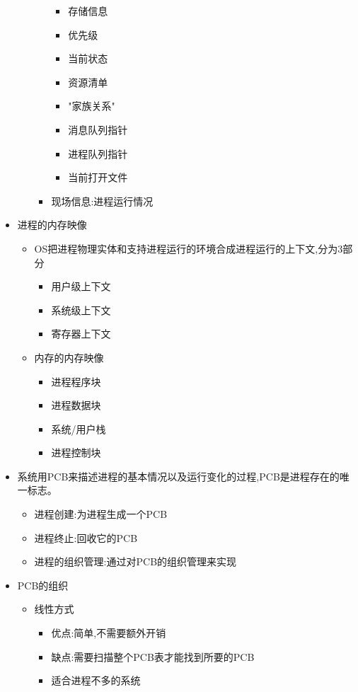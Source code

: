 \documentclass[a4paper,12pt,notitlepage]{article}
\begin{document}
\begin{itemize}
\begin{itemize}
\begin{itemize}
\begin{itemize}
				\item 存储信息
				\item 优先级
				\item 当前状态
				\item 资源清单
				\item "家族关系"
				\item 消息队列指针
				\item 进程队列指针
				\item 当前打开文件
			\end{itemize}
			\item 现场信息:进程运行情况
		\end{itemize}
	\end{itemize}
	\item 进程的内存映像
	\begin{itemize}
		\item OS把进程物理实体和支持进程运行的环境合成进程运行的上下文,分为3部分
		\begin{itemize}
			\item 用户级上下文
			\item 系统级上下文
			\item 寄存器上下文
		\end{itemize}
		\item 内存的内存映像
		\begin{itemize}
			\item 进程程序块
			\item 进程数据块
			\item 系统/用户栈
			\item 进程控制块
		\end{itemize}
	\end{itemize}
	\item 系统用PCB来描述进程的基本情况以及运行变化的过程,PCB是进程存在的唯一标志。
	\begin{itemize}
		\item 进程创建:为进程生成一个PCB
		\item 进程终止:回收它的PCB
		\item 进程的组织管理:通过对PCB的组织管理来实现
	\end{itemize}
	\item PCB的组织
	\begin{itemize}
		\item 线性方式
		\begin{itemize}
			\item 优点:简单,不需要额外开销
			\item 缺点:需要扫描整个PCB表才能找到所要的PCB
			\item 适合进程不多的系统

\end{itemize}
\end{itemize}
\end{itemize}
\end{document}
